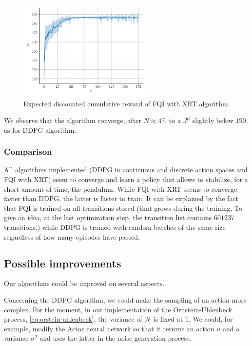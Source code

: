 \documentclass[a4paper, 12pt]{article}
\begin{document}
    \begin{figure}[H]
        \centering
        \includegraphics[width=0.6\textwidth]{resources/pdf/fqi_J_11_20.pdf}
        \caption{Expected discounted cumulative reward of FQI with XRT algorithm.}
        \label{fig:fqi.xrt.rewards}
    \end{figure}
    
    We observe that the algorithm converge, after $N \approx \num{47}$, to a $J^{\mu}$ slightly below $\num{190}$, as for DDPG algorithm.
    
    \subsubsection{Comparison}
    
    All algorithms implemented (DDPG in continuous and discrete action spaces and FQI with XRT) seem to converge and learn a policy that allows to stabilize, for a short amount of time, the pendulum. While FQI with XRT seems to converge faster than DDPG, the latter is faster to train. It can be explained by the fact that FQI is trained on all transitions stored (that grows during the training. To give an idea, at the last optimization step, the transition list contains $\num{601237}$ transitions.) while DDPG is trained with random batches of the same size regardless of how many episodes have passed.
    
    \subsection{Possible improvements}
    
    Our algorithms could be improved on several aspects.
    
    Concerning the DDPG algorithm, we could make the sampling of an action more complex. For the moment, in our implementation of the Ornstein-Uhlenbeck process, \ie{} \eqref{eq:orstein-uhlenbeck}, the variance of $\mathcal{N}$ is fixed at $1$. We could, for example, modify the Actor neural network so that it returns an action $u$ and a variance $\sigma^2$ and uses the latter in the noise generation process.
    
\end{document}
